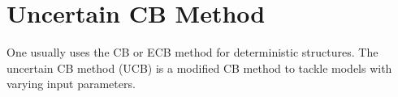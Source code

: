 %
%

\section{Uncertain CB Method}
\label{sec: UCB}

One usually uses the CB or ECB method for deterministic structures. 
The uncertain CB method (UCB) is a modified CB method to tackle models with varying input parameters.



